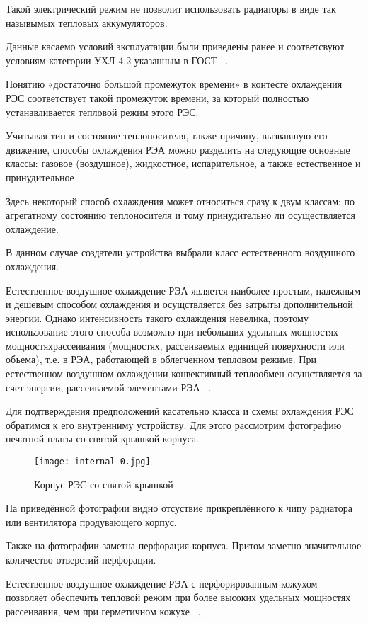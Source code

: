 Такой электрический режим не позволит использовать радиаторы в виде
так назывымых тепловых аккумуляторов.

Данные касаемо условий эксплуатации были приведены ранее и
соответсвуют условиям категории УХЛ 4.2 указанным в ГОСТ
~\cite{GOST_15150-69}.

Понятию «достаточно большой промежуток времени» в контесте охлаждения
РЭС соответствует такой промежуток времени, за который полностью
устанавливается тепловой режим этого РЭС.

Учитывая тип и состояние теплоносителя, также причину, вызвавшую его
движение, способы охлаждения РЭА можно разделить на следующие основные
классы: газовое (воздушное), жидкостное, испарительное, а также
естественное и принудительное ~\cite{Rotkop1976}.

Здесь некоторый способ охлаждения может относиться сразу к двум
классам: по агрегатному состоянию теплоносителя и тому принудительно
ли осуществляется охлаждение.

В данном случае создатели устройства выбрали класс естественного
воздушного охлаждения.

Естественное воздушное охлаждение РЭА является наиболее простым,
надежным и дешевым способом охлаждения и осущствляется без затрыты
дополнительной энергии. Однако интенсивность такого охлаждения
невелика, поэтому использование этого способа возможно при небольших
удельных мощностях мощностяхрассеивания (мощностях, рассеиваемых
единицей поверхности или объема), т.е. в РЭА, работающей в облегченном
тепловом режиме. При естественном воздушном охлаждении конвективный
теплообмен осущствляется за счет энергии, рассеиваемой элементами РЭА ~\cite{Rotkop1976}.

Для подтверждения предположений касательно класса и схемы охлаждения
РЭС обратимся к его внутренниму устройству. Для этого рассмотрим
фотографию печатной платы со снятой крышкой корпуса.

\begin{figure}[hb]
  \centering
  \texttt{[image: internal-0.jpg]}
  \caption{Корпус РЭС со снятой крышкой ~\cite{INTERNAL_PHOTOS}.}
\end{figure}

На приведённой фотографии видно отсуствие прикреплённого к чипу
радиатора или вентилятора продувающего корпус.

Также на фотографии заметна перфорация корпуса. Притом заметно
значительное количество отверстий перфорации.

Естественное воздушное охлаждение РЭА с перфорированным кожухом
позволяет обеспечить тепловой режим при более высоких удельных
мощностях рассеивания, чем при герметичном кожухе ~\cite{Rotkop1976}.


